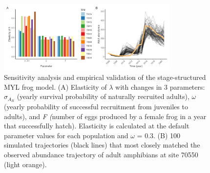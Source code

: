\documentclass[9pt,twocolumn,twoside,lineno]{pnas-new}
\begin{document}
\begin{figure}

{\centering \includegraphics[width=0.8\textwidth]{figures/pop_viability_figures_for_supp.jpg}

}

\caption{\label{fig-viability-supp}Sensitivity analysis and empirical
validation of the stage-structured MYL frog model. (A) Elasticity of
\(\lambda\) with changes in 3 parameters: \(\sigma_{A_R}\) (yearly
survival probability of naturally recruited adults), \(\omega\) (yearly
probability of successful recruitment from juveniles to adults), and
\emph{F (}number of eggs produced by a female frog in a year that
successfully hatch). Elasticity is calculated at the default parameter
values for each population and \(\omega\) = 0.3. (B) 100 simulated
trajectories (black lines) that most closely matched the observed
abundance trajectory of adult amphibians at site 70550 (light orange).}

\end{figure}

\newpage
\end{document}
